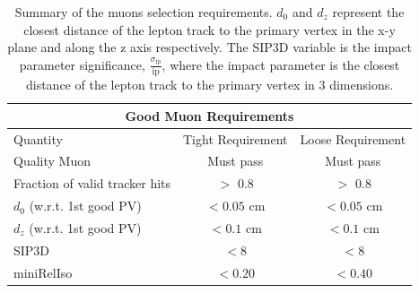     \begin{table}[!h]
      \begin{center}
        \caption[Summary of the muons selection requirements.]{\label{table:muons} Summary of the muons selection requirements. $d_{0}$ and $d_{z}$ represent the closest distance of the lepton track to the primary vertex in the x-y plane and along the z axis respectively. The SIP3D variable is the impact parameter significance, $\frac{\sigma_\text{ip}}{\text{ip}}$, where the impact parameter is the closest distance of the lepton track to the primary vertex in 3 dimensions.}
        \begin{tabular}{l|c|c}
          \hline
          \hline
          \multicolumn{3}{c}{Good Muon Requirements} \\
          \hline
          Quantity   &  Tight Requirement & Loose Requirement \\
          \hline
          Quality Muon                      & Must pass   & Must pass     \\
          Fraction of valid tracker hits    & $>$ 0.8     & $>$ 0.8  \\ 
          \hline
          $d_{0}$ (w.r.t. 1st good PV)   & $<0.05$ cm & $<0.05$ cm \\
          $d_{z}$ (w.r.t. 1st good PV)   & $<0.1$ cm  & $<0.1$ cm  \\
          SIP3D                          & $< 8$      & $< 8$      \\
          miniRelIso                     & $<0.20$    & $<0.40$       \\
          \hline
        \end{tabular}
      \end{center}
    \end{table}

